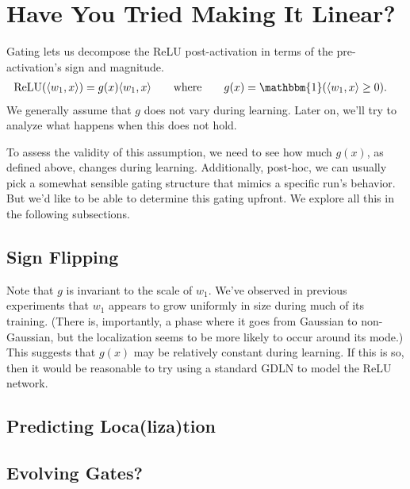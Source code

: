 \documentclass{article}
\begin{document}
\section{Have You Tried Making It Linear?}

Gating lets us decompose the ReLU post-activation in terms of the pre-activation's sign and magnitude.
\begin{align}
  \text{ReLU}( \langle w_1, x \rangle ) &= g(x) \langle w_1, x \rangle \qquad \text{where} \qquad g(x) = \mathbbm{1}( \langle w_1, x \rangle \geq 0 ).
\end{align}
We generally assume that $g$ does not vary during learning.
Later on, we'll try to analyze what happens when this does not hold.

To assess the validity of this assumption, we need to see how much $g(x)$, as defined above, changes during learning.
Additionally, post-hoc, we can usually pick a somewhat sensible gating structure that mimics a specific run's behavior.
But we'd like to be able to determine this gating upfront.
We explore all this in the following subsections.

\subsection{Sign Flipping}

Note that $g$ is invariant to the scale of $w_1$.
We've observed in previous experiments that $w_1$ appears to grow uniformly in size during much of its training.
(There is, importantly, a phase where it goes from Gaussian to non-Gaussian, but the localization seems to be more likely to occur around its mode.)
This suggests that $g(x)$ may be relatively constant during learning.
If this is so, then it would be reasonable to try using a standard GDLN to model the ReLU network.


\subsection{Predicting Loca(liza)tion}

\subsection{Evolving Gates?}


\end{document}
